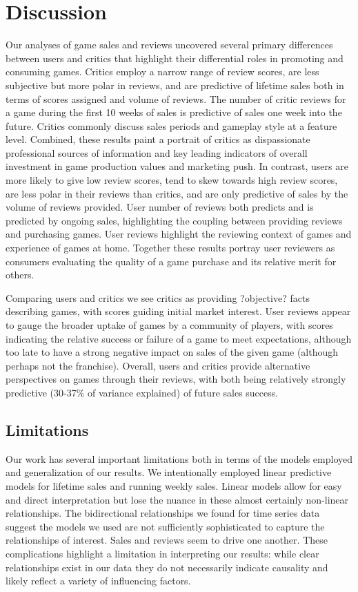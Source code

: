 \documentclass[letterpaper]{article}
\begin{document}
\section{Discussion}
Our analyses of game sales and reviews uncovered several primary differences between users and critics that highlight their differential roles in promoting and consuming games. Critics employ a narrow range of review scores, are less subjective but more polar in reviews, and are predictive of lifetime sales both in terms of scores assigned and volume of reviews. The number of critic reviews for a game during the first 10 weeks of sales is predictive of sales one week into the future. Critics commonly discuss sales periods and gameplay style at a feature level. Combined, these results paint a portrait of critics as dispassionate professional sources of information and key leading indicators of overall investment in game production values and marketing push. In contrast, users are more likely to give low review scores, tend to skew towards high review scores, are less polar in their reviews than critics, and are only predictive of sales by the volume of reviews provided. User number of reviews both predicts and is predicted by ongoing sales, highlighting the coupling between providing reviews and purchasing games. User reviews highlight the reviewing context of games and experience of games at home. Together these results portray user reviewers as consumers evaluating the quality of a game purchase and its relative merit for others.

Comparing users and critics we see critics as providing ?objective? facts describing games, with scores guiding initial market interest. User reviews appear to gauge the broader uptake of games by a community of players, with scores indicating the relative success or failure of a game to meet expectations, although too late to have a strong negative impact on sales of the given game (although perhaps not the franchise). Overall, users and critics provide alternative perspectives on games through their reviews, with both being relatively strongly predictive (30-37\% of variance explained) of future sales success.

\subsection{Limitations}
Our work has several important limitations both in terms of the models employed and generalization of our results. We intentionally employed linear predictive models for lifetime sales and running weekly sales. Linear models allow for easy and direct interpretation but lose the nuance in these almost certainly non-linear relationships. The bidirectional relationships we found for time series data suggest the models we used are not sufficiently sophisticated to capture the relationships of interest. Sales and reviews seem to drive one another. These complications highlight a limitation in interpreting our results: while clear relationships exist in our data they do not necessarily indicate causality and likely reflect a variety of influencing factors.
\end{document}
